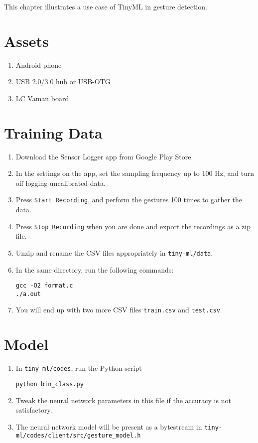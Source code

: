 This chapter illustrates a use case of TinyML in gesture detection.

\section{Assets}
\begin{enumerate}
    \item Android phone
    \item USB 2.0/3.0 hub or USB-OTG
    \item LC Vaman board
\end{enumerate}

\section{Training Data}
\begin{enumerate}
    \item Download the Sensor Logger app from Google Play Store.
    \item In the settings on the app, set the sampling frequency up to 100 Hz, 
    and turn off logging uncalibrated data.
    \item Press \texttt{Start Recording}, and perform the gestures 100 times
    to gather the data.
    \item Press \texttt{Stop Recording} when you are done and export the 
    recordings as a zip file.
    \item Unzip and rename the CSV files appropriately in \texttt{tiny-ml/data}.
    \item In the same directory, run the following commands:
    \begin{lstlisting}
gcc -O2 format.c
./a.out
    \end{lstlisting}
    \item You will end up with two more CSV files \texttt{train.csv} and
    \texttt{test.csv}.
\end{enumerate}

\section{Model}
\begin{enumerate}
    \item In \texttt{tiny-ml/codes}, run the Python script
    \begin{lstlisting}
python bin_class.py
    \end{lstlisting}
    \item Tweak the neural network parameters in this file if the accuracy is
    not satisfactory.
    \item The neural network model will be present as a bytestream in 
    \texttt{tiny-ml/codes/client/src/gesture\_model.h}
\end{enumerate}

